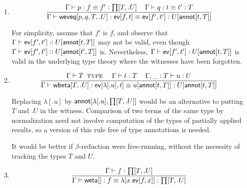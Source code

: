 \documentclass[11pt]{article}
\newcommand{\eqd}{\equiv}
\newcommand{\spc}{{\,\,\,\,\,\,\,}}
\newcommand{\ccolon}[1]{\vcentcolon#1}
\newcommand{\ccheck}[1]{\vcentcolon#1}  %
\newcommand{\csynth}[1]{\vcentcolon\vcentcolon #1} %
\newcommand{\Type}{\mathop{\text{ \sc type}}}
\newcommand{\ha}[2]{#1[#2]}
\newcommand{\weta}{{\sf weta}}
\newcommand{\annot}{{\sf annot}}
\newcommand{\haa}[2]{\ha\annot{#1,#2}}
\newcommand{\ev}{{\sf ev}}
\newcommand{\wbeta}{{\sf wbeta}}
\newcommand{\weveq}{{\sf weveq}}
\newcommand{\var}{\char`_}
\begin{document}
\begin{enumerate}

Some space is saved by not annotating $\ha\ev{f,o}$ with $T$ and $.U$.

\item 
\[\frac{
   \Gamma\vdash p : f \eqd f' \ccolon{\ha\prod{T,.U}}\spc 
   \Gamma\vdash q : t \eqd t' \ccolon{T}
   }{
   \Gamma\vdash \ha\weveq{p,q,T,.U} : \ha\ev{f,t} \eqd \ha\ev{f',t'} \ccolon{U[\haa t T]}
  }\]

For simplicity, assume that $f'$ is $f$, and observe that $\Gamma \vdash
\ha\ev{f',t'} \csynth{U[\haa t T]}$ may not be valid, even though $\Gamma
\vdash \ha\ev{f',t'} \csynth{U[\haa {t'}{T}]}$ is.  Nevertheless, $\Gamma \vdash
\ha\ev{f',t'} : U[\haa{t}{T}]$ is valid in the underlying type theory where
the witnesses have been forgotten.

\item 
\[\frac{ \Gamma \vdash T \Type \spc \Gamma\vdash t \ccheck{T}\spc \Gamma, \var \ccolon{T}\vdash u \ccheck{U}}{\Gamma\vdash \ha\wbeta{T,.U} : \ha\ev{\ha\lambda{.u},t} \eqd u[\haa{t}{T}] : U[\haa{t}{T}]}\]

Replacing $\ha\lambda{.u}$ by $\haa{\ha\lambda{.u}}{\ha\prod{T,.U}}$ would
be an alternative to putting $T$ and $.U$ in the witness.  Comparison of two
terms of the same type by normalization need not involve computation of the
types of partially applied results, so a version of this rule free of type
annotations is needed.

It would be better if $\beta$-reduction were free-running, without the
necessity of tracking the types $T$ and $U$.

\item 
\[
  \frac{\Gamma\vdash f \ccheck{\ha\prod{T,.U}}}
       {\Gamma\vdash \ha\weta{} : f \eqd \ha\lambda{x.\ha\ev{f,x}} : \ha\prod{T,.U}}
\]

\end{enumerate}



\end{document}

